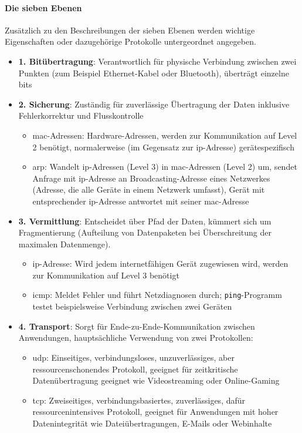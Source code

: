 \documentclass[11pt, a4paper]{article}
\begin{document}
\paragraph{Die sieben Ebenen}
Zusätzlich zu den Beschreibungen der sieben Ebenen werden wichtige Eigenschaften oder dazugehörige Protokolle untergeordnet angegeben.
\begin{itemize}
	\item \textbf{1. Bitübertragung}: Verantwortlich für physische Verbindung zwischen zwei Punkten (zum Beispiel Ethernet-Kabel oder Bluetooth), überträgt einzelne \glspl{bit} 
	\item \textbf{2. Sicherung}: Zuständig für zuverlässige Übertragung der Daten inklusive Fehlerkorrektur und Flusskontrolle
	\begin{itemize}
		\item \gls{mac}-Adressen: Hardware-Adressen, werden zur Kommunikation auf Level 2 benötigt, normalerweise (im Gegensatz zur \gls{ip}-Adresse) gerätespezifisch
		\item \gls{arp}: Wandelt \gls{ip}-Adressen (Level 3) in \gls{mac}-Adressen (Level 2) um, sendet Anfrage mit \gls{ip}-Adresse an Broadcasting-Adresse eines Netzwerkes (Adresse, die alle Geräte in einem Netzwerk umfasst), Gerät mit entsprechender \gls{ip}-Adresse antwortet mit seiner \gls{mac}-Adresse
	\end{itemize}
	\item \textbf{3. Vermittlung}: Entscheidet über Pfad der Daten, kümmert sich um Fragmentierung (Aufteilung von Datenpaketen bei Überschreitung der maximalen Datenmenge).
	\begin{itemize}
		\item \gls{ip}-Adresse: Wird jedem internetfähigen Gerät zugewiesen wird, werden zur Kommunikation auf Level 3 benötigt
		\item \gls{icmp}: Meldet Fehler und führt Netzdiagnosen durch; \texttt{ping}-Programm testet beispielsweise Verbindung zwischen zwei Geräten~\cite{ICMPFortinet:online}
	\end{itemize}
	\item \textbf{4. Transport}: Sorgt für Ende-zu-Ende-Kommunikation zwischen Anwendungen, hauptsächliche Verwendung von zwei Protokollen:
	\begin{itemize}
		\item \gls{udp}: Einseitiges, verbindungsloses, unzuverlässiges, aber ressourcenschonendes Protokoll, geeignet für zeitkritische Datenübertragung geeignet wie Videostreaming oder Online-Gaming
		\item \gls{tcp}: Zweiseitiges, verbindungsbasiertes, zuverlässiges, dafür ressourcenintensives Protokoll, geeignet für Anwendungen mit hoher Datenintegrität wie Dateiübertragungen, E-Mails oder Webinhalte

\end{itemize}
\end{itemize}
\end{document}
